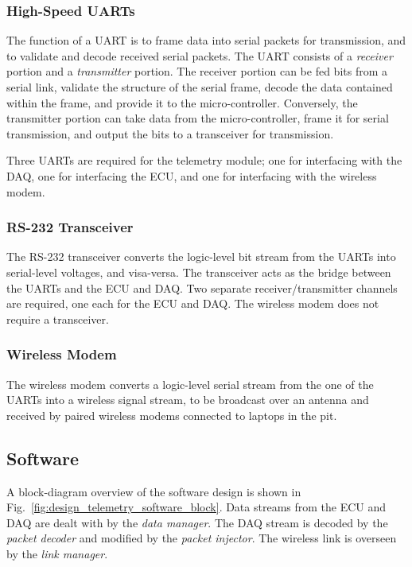 \subsubsection{High-Speed UARTs}

The function of a UART is to frame data into serial packets for transmission, and to validate and decode received serial packets. The UART consists of a \emph{receiver} portion and a \emph{transmitter} portion. The receiver portion can be fed bits from a serial link, validate the structure of the serial frame, decode the data contained within the frame, and provide it to the micro-controller. Conversely, the transmitter portion can take data from the micro-controller, frame it for serial transmission, and output the bits to a transceiver for transmission.

Three UARTs are required for the telemetry module; one for interfacing with the DAQ, one for interfacing the ECU, and one for interfacing with the wireless modem. 

\subsubsection{RS-232 Transceiver\label{sec:design_telemetry_rs232}}

The RS-232 transceiver converts the logic-level bit stream from the UARTs into serial-level voltages, and visa-versa. The transceiver acts as the bridge between the UARTs and the ECU and DAQ. Two separate receiver/transmitter channels are required, one each for the ECU and DAQ. The wireless modem does not require a transceiver.

\subsubsection{Wireless Modem}

The wireless modem converts a logic-level serial stream from the one of the UARTs into a wireless signal stream, to be broadcast over an antenna and received by paired wireless modems connected to laptops in the pit. 

\subsection{Software}
	
A block-diagram overview of the software design is shown in Fig.\ \ref{fig:design_telemetry_software_block}. Data streams from the ECU and DAQ are dealt with by the \emph{data manager}. The DAQ stream is decoded by the \emph{packet decoder} and modified by the \emph{packet injector}. The wireless link is overseen by the \emph{link manager}. 

